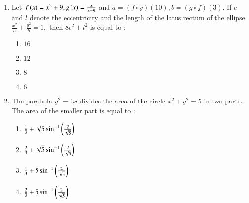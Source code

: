 \documentclass[journal,12pt,onecolumn]{IEEEtran}
\theoremstyle{remark}
\begin{document}
\begin{enumerate}
    \item Let $f\left(x\right)=x^2+9, g\left(x\right)= \frac{x}{x-9}$ and $a=(f \circ g)(10), b= (g \circ f)(3).$ If $e$ and $l$ denote the eccentricity and the length of the latus rectum of the ellipse $\frac{x^2}{a} + \frac{y^2}{b} = 1,$ then $8e^2 + l^2$ is equal to :
    \begin{enumerate}
        \item $16$
        \item $12$
        \item $8$
        \item $6$ \\
    \end{enumerate}


    \item The parabola $y^2=4x$ divides the area of the circle $x^2+y^2=5$ in two parts. The area of the smaller part is equal to :
    \begin{enumerate}
        \item $\frac{1}{3} + \sqrt{5} \sin^{-1} \left(\frac{2}{\sqrt{5}}\right)$
        \item $\frac{2}{3} + \sqrt{5} \sin^{-1} \left(\frac{2}{\sqrt{5}}\right)$
        \item $\frac{1}{3} + 5 \sin^{-1} \left(\frac{2}{\sqrt{5}}\right)$
        \item $\frac{2}{3} + 5 \sin^{-1} \left(\frac{2}{\sqrt{5}}\right)$\\
    \end{enumerate}
    
    

\end{enumerate}
\end{document}
